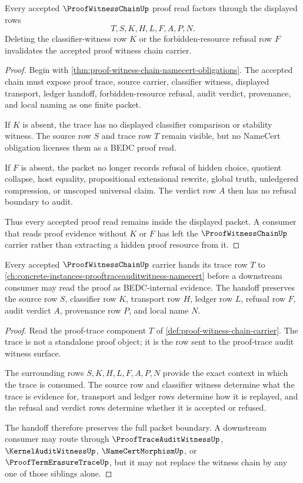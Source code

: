 \begin{theorem}
\label{thm:proof-witness-chain-ledger-nonescape}
Every accepted $\ProofWitnessChainUp$ proof read factors through the displayed rows
$$
T,S,K,H,L,F,A,P,N.
$$
Deleting the classifier-witness row $K$ or the forbidden-resource refusal row $F$ invalidates the accepted proof witness chain carrier.
\end{theorem}
\begin{proof}
Begin with \autoref{thm:proof-witness-chain-namecert-obligations}. The accepted chain must expose proof trace, source carrier, classifier witness, displayed transport, ledger handoff, forbidden-resource refusal, audit verdict, provenance, and local naming as one finite packet.

If $K$ is absent, the trace has no displayed classifier comparison or stability witness. The source row $S$ and trace row $T$ remain visible, but no NameCert obligation licenses them as a BEDC proof read.

If $F$ is absent, the packet no longer records refusal of hidden choice, quotient collapse, host equality, propositional extensional rewrite, global truth, unledgered compression, or unscoped universal claim. The verdict row $A$ then has no refusal boundary to audit.

Thus every accepted proof read remains inside the displayed packet. A consumer that reads proof evidence without $K$ or $F$ has left the $\ProofWitnessChainUp$ carrier rather than extracting a hidden proof resource from it.
\end{proof}

\begin{theorem}
\label{thm:proof-witness-chain-prooftrace-handoff}
Every accepted $\ProofWitnessChainUp$ carrier hands its trace row $T$ to \autoref{ch:concrete-instances-prooftraceauditwitness-namecert} before a downstream consumer may read the proof as BEDC-internal evidence. The handoff preserves the source row $S$, classifier row $K$, transport row $H$, ledger row $L$, refusal row $F$, audit verdict $A$, provenance row $P$, and local name $N$.
\end{theorem}
\begin{proof}
Read the proof-trace component $T$ of \autoref{def:proof-witness-chain-carrier}. The trace is not a standalone proof object; it is the row sent to the proof-trace audit witness surface.

The surrounding rows $S,K,H,L,F,A,P,N$ provide the exact context in which the trace is consumed. The source row and classifier witness determine what the trace is evidence for, transport and ledger rows determine how it is replayed, and the refusal and verdict rows determine whether it is accepted or refused.

The handoff therefore preserves the full packet boundary. A downstream consumer may route through $\ProofTraceAuditWitnessUp$, $\KernelAuditWitnessUp$, $\NameCertMorphismUp$, or $\ProofTermErasureTraceUp$, but it may not replace the witness chain by any one of those siblings alone.
\end{proof}

